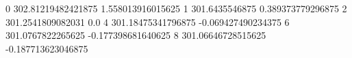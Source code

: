 0 302.81219482421875 1.558013916015625
1 301.6435546875 0.389373779296875
2 301.2541809082031 0.0
4 301.18475341796875 -0.069427490234375
6 301.0767822265625 -0.177398681640625
8 301.06646728515625 -0.187713623046875

